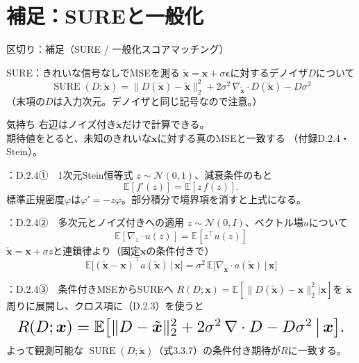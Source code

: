\section{補足：SUREと一般化}
\assuppl
\begin{frame}{区切り：補足（SURE / 一般化スコアマッチング）}
    \tableofcontents[currentsection]
\end{frame}
\assuppl
\begin{frame}{SURE：きれいな信号なしでMSEを測る}
    $\tilde{\bm{x}}=\bm{x}+\sigma\bm{\epsilon}$に対するデノイザ$D$について
    \[
        \operatorname{SURE}(D;\tilde{\bm{x}})
        =
        \|D(\tilde{\bm{x}})-\tilde{\bm{x}}\|_{2}^{2}
        +
        2\sigma^{2}\,\nabla_{\tilde{\bm{x}}}\!\cdot D(\tilde{\bm{x}})
        -D\sigma^{2}
        \tag{3.3.7}
    \]
    （末項の$D$は入力次元。デノイザと同じ記号なので注意。）
    \begin{exampleblock}{気持ち}
        右辺はノイズ付き$\tilde{\bm{x}}$だけで計算できる。\\
        期待値をとると、未知のきれいな$\bm{x}$に対する真のMSEと一致する
        （付録D.2.4・Stein）。
    \end{exampleblock}
\end{frame}
\assuppl
\begin{frame}{\supplmark：D.2.4①　1次元Stein恒等式}
    $z\sim\mathcal{N}(0,1)$、減衰条件のもと
    \[
        \mathbb{E}[f'(z)]=\mathbb{E}[z\,f(z)].
    \]
    標準正規密度$\varphi$は$\varphi'=-z\varphi$。部分積分で境界項を消すと上式になる。
\end{frame}
\assuppl
\begin{frame}{\supplmark：D.2.4②　多次元とノイズ付きへの適用}
    $z\sim\mathcal{N}(0,I)$、ベクトル場$u$について
    \[
        \mathbb{E}[\nabla_z\cdot u(z)]
        =
        \mathbb{E}[z^{\top}u(z)]
        \tag{D.2.2}
    \]
    $\tilde{\bm{x}}=\bm{x}+\sigma z$と連鎖律より（固定$\bm{x}$の条件付きで）
    \[
        \mathbb{E}
        \bigl[(\tilde{\bm{x}}-\bm{x})^{\top}a(\tilde{\bm{x}})\,\big|\,\bm{x}\bigr]
        =
        \sigma^{2}\,
        \mathbb{E}
        \bigl[\nabla_{\tilde{\bm{x}}}\cdot a(\tilde{\bm{x}})\,\big|\,\bm{x}\bigr]
        \tag{D.2.3}
    \]
\end{frame}
\assuppl
\begin{frame}{\supplmark：D.2.4③　条件付きMSEからSUREへ}
    $R(D;\bm{x})=\mathbb{E}[\|D(\tilde{\bm{x}})-\bm{x}\|_2^2|\bm{x}]$を
    $\tilde{\bm{x}}$周りに展開し、クロス項に（D.2.3）を使うと
    \[
        \resizebox{0.98\textwidth}{!}{$
        R(D;\bm{x})
        =
        \mathbb{E}
        \bigl[
        \|D-\tilde{\bm{x}}\|_2^2
        +
        2\sigma^{2}\,\nabla\cdot D
        -
        D\sigma^{2}
        \,\big|\,\bm{x}
        \bigr].
        $}
    \]
    よって観測可能な
    $\operatorname{SURE}(D;\tilde{\bm{x}})$（式3.3.7）の条件付き期待が$R$に一致する。
\end{frame}
